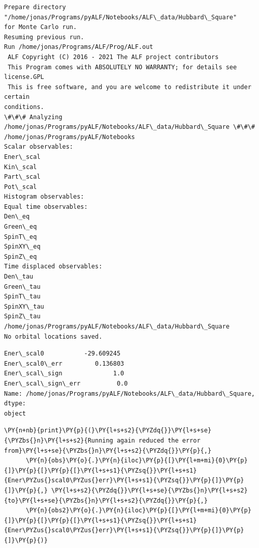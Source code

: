     \begin{Verbatim}[commandchars=\\\{\}]
Prepare directory "/home/jonas/Programs/pyALF/Notebooks/ALF\_data/Hubbard\_Square"
for Monte Carlo run.
Resuming previous run.
Run /home/jonas/Programs/ALF/Prog/ALF.out
 ALF Copyright (C) 2016 - 2021 The ALF project contributors
 This Program comes with ABSOLUTELY NO WARRANTY; for details see license.GPL
 This is free software, and you are welcome to redistribute it under certain
conditions.
\#\#\# Analyzing /home/jonas/Programs/pyALF/Notebooks/ALF\_data/Hubbard\_Square \#\#\#
/home/jonas/Programs/pyALF/Notebooks
Scalar observables:
Ener\_scal
Kin\_scal
Part\_scal
Pot\_scal
Histogram observables:
Equal time observables:
Den\_eq
Green\_eq
SpinT\_eq
SpinXY\_eq
SpinZ\_eq
Time displaced observables:
Den\_tau
Green\_tau
SpinT\_tau
SpinXY\_tau
SpinZ\_tau
/home/jonas/Programs/pyALF/Notebooks/ALF\_data/Hubbard\_Square
No orbital locations saved.
    \end{Verbatim}

            \begin{tcolorbox}[breakable, size=fbox, boxrule=.5pt, pad at break*=1mm, opacityfill=0]
\begin{Verbatim}[commandchars=\\\{\}]
Ener\_scal0           -29.609245
Ener\_scal0\_err         0.136803
Ener\_scal\_sign              1.0
Ener\_scal\_sign\_err          0.0
Name: /home/jonas/Programs/pyALF/Notebooks/ALF\_data/Hubbard\_Square, dtype:
object
\end{Verbatim}
\end{tcolorbox}
        
    \begin{tcolorbox}[breakable, size=fbox, boxrule=1pt, pad at break*=1mm,colback=cellbackground, colframe=cellborder]
\begin{Verbatim}[commandchars=\\\{\}]
\PY{n+nb}{print}\PY{p}{(}\PY{l+s+s2}{\PYZdq{}}\PY{l+s+se}{\PYZbs{}n}\PY{l+s+s2}{Running again reduced the error from}\PY{l+s+se}{\PYZbs{}n}\PY{l+s+s2}{\PYZdq{}}\PY{p}{,}
      \PY{n}{obs}\PY{o}{.}\PY{n}{iloc}\PY{p}{[}\PY{l+m+mi}{0}\PY{p}{]}\PY{p}{[}\PY{p}{[}\PY{l+s+s1}{\PYZsq{}}\PY{l+s+s1}{Ener\PYZus{}scal0\PYZus{}err}\PY{l+s+s1}{\PYZsq{}}\PY{p}{]}\PY{p}{]}\PY{p}{,} \PY{l+s+s2}{\PYZdq{}}\PY{l+s+se}{\PYZbs{}n}\PY{l+s+s2}{to}\PY{l+s+se}{\PYZbs{}n}\PY{l+s+s2}{\PYZdq{}}\PY{p}{,}
      \PY{n}{obs2}\PY{o}{.}\PY{n}{iloc}\PY{p}{[}\PY{l+m+mi}{0}\PY{p}{]}\PY{p}{[}\PY{p}{[}\PY{l+s+s1}{\PYZsq{}}\PY{l+s+s1}{Ener\PYZus{}scal0\PYZus{}err}\PY{l+s+s1}{\PYZsq{}}\PY{p}{]}\PY{p}{]}\PY{p}{)}
\end{Verbatim}
\end{tcolorbox}

